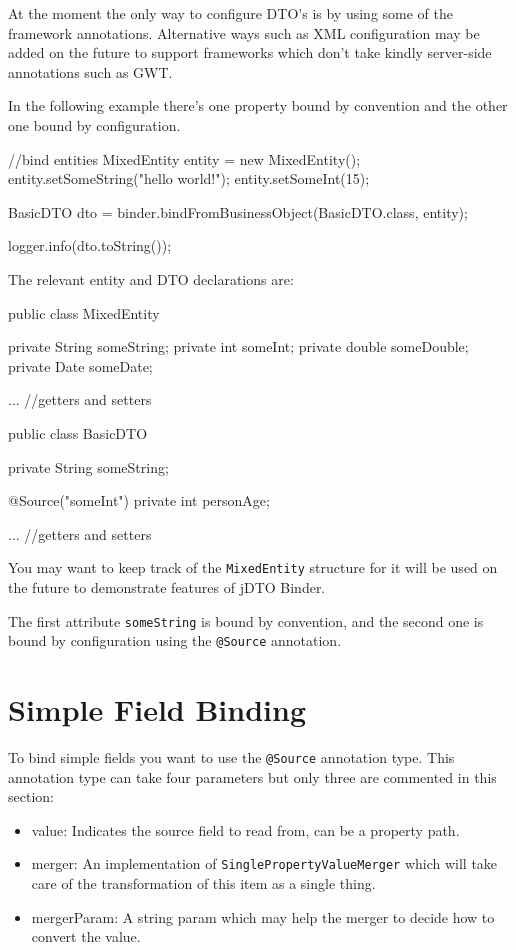 \documentclass[11pt]{article}
\newcommand{\JDTO}{jDTO Binder\xspace}
\begin{document}
At the moment the only way to configure DTO's is by using some of the framework annotations. Alternative ways such as XML configuration may be added on the future to support frameworks which don't take kindly server-side annotations such as GWT.

In the following example there's one property bound by convention and the other one bound by configuration.


\begin{java}
//bind entities
MixedEntity entity = new MixedEntity();
entity.setSomeString("hello world!");
entity.setSomeInt(15);
        
BasicDTO dto = binder.bindFromBusinessObject(BasicDTO.class, entity);
        
logger.info(dto.toString());
\end{java}

The relevant entity and DTO declarations are:


\begin{java}
 public class MixedEntity {
    private String someString;
    private int someInt;
    private double someDouble;
    private Date someDate;
    
    ... //getters and setters
}

public class BasicDTO {
    private String someString;
    
    @Source("someInt")
    private int personAge;
    
    ... //getters and setters
}
\end{java}

You may want to keep track of the \texttt{MixedEntity} structure for it will be used on the future
to demonstrate features of \JDTO.

The first attribute \texttt{someString} is bound by convention, and the second one is bound
by configuration using the \texttt{@Source} annotation.

\section{Simple Field Binding}


To bind simple fields you want to use the \texttt{@Source} annotation type.
This annotation type can take four parameters but only three are commented in this section:

\begin{itemize}
 \item value: Indicates the source field to read from, can be a property path.
 \item merger: An implementation of \texttt{SinglePropertyValueMerger} which will take care of the transformation of this item as a single thing.
 \item mergerParam: A string param which may help the merger to decide how to convert the value.
\end{itemize}
\end{document}
